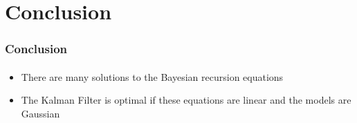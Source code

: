 \section{Conclusion}
\begin{frame}
\frametitle{Conclusion}
\mypagenum
\framesubtitle{}
\begin{itemize}
\item There are many solutions to the Bayesian recursion equations
\item The Kalman Filter is optimal if these equations are linear and the models are Gaussian
\end{itemize}
\end{frame}







